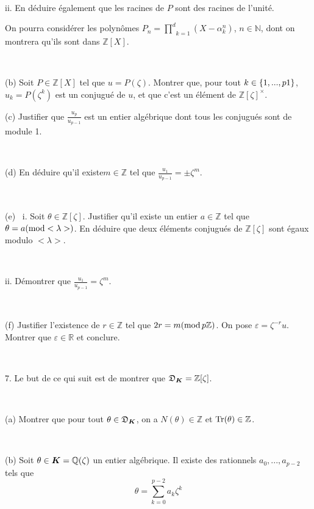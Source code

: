\

{\hspace{3em}}ii. En d{\'e}duire {\'e}galement que les racines de $P$ sont
des racines de l'unit{\'e}.

 On pourra consid{\'e}rer les polyn{\^o}mes
$P_n = \underset{k = 1}{\overset{d}{\prod}} (X - \alpha_k^n)$, $n \in
\mathbb{N}$, dont on montrera qu'ils sont dans $\mathbb{Z}[X]$.

\

\quad (b) Soit $P \in \mathbb{Z}[X]$ tel que $u = P (\zeta)$. Montrer que,
pour tout $k \in \{1, . . ., p \nonconverted{minus} 1\}$, $u_k = P (\zeta^k)$
est un conjugu{\'e} de $u$, et que c'est un {\'e}l{\'e}ment de
$\mathbb{Z}[\zeta]^{\times}$.

\quad

\quad (c) Justifier que $\frac{u_p}{u_{p - 1}}$ est un entier alg{\'e}brique
dont tous les conjugu{\'e}s sont de module 1.

\

\quad (d) En d{\'e}duire qu'il existe$m \in \mathbb{Z}$ tel que
$\frac{u_1}{u_{p - 1}} = \pm \zeta^m$.

\

\quad (e) \ i. Soit $\theta \in \mathbb{Z}[\zeta]$. Justifier qu'il existe un
entier $a \in \mathbb{Z}$ tel que $\theta = a (\tmop{mod} < \lambda >)$. En
d{\'e}duire que deux {\'e}l{\'e}ments conjugu{\'e}s de $\mathbb{Z}[\zeta]$
sont {\'e}gaux modulo $< \lambda >$.

\

{\hspace{3em}}ii. D{\'e}montrer que $\frac{u_1}{u_{p - 1}} = \zeta^m$.

\

\quad (f) Justifier l'existence de $r \in \mathbb{Z}$ tel que $2 r = m
(\tmop{mod} p\mathbb{Z})$. On pose $\varepsilon = \zeta^{- r} u.$ Montrer que
$\varepsilon \in \mathbb{R}$ et conclure.

\

7. Le but de ce qui suit est de montrer que $\mathfrak{D}_{\tmmathbf{K}}
=\mathbb{Z}[\zeta]$.

\

\quad (a) Montrer que pour tout $\theta \in \mathfrak{D}_{\tmmathbf{K}}$, on
a $N (\theta) \in \mathbb{Z}$ et $\tmop{Tr} (\theta) \in \mathbb{Z}$.

\

\quad (b) Soit $\theta \in \tmmathbf{K} =\mathbb{Q}(\zeta)$ un entier
alg{\'e}brique. Il existe des rationnels $a_0, . . ., a_{p - 2}$ tels que
\[ \theta = \underset{k = 0}{\overset{p - 2}{\sum}} a_k \zeta^k \]


